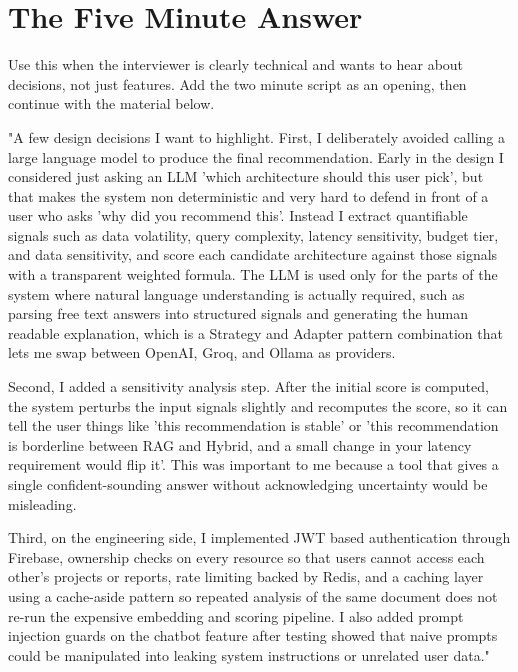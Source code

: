 \documentclass[11pt,a4paper]{report}
\begin{document}
\section{The Five Minute Answer}

Use this when the interviewer is clearly technical and wants to hear about decisions, not just features. Add the two minute script as an opening, then continue with the material below.

\begin{notebox}
"A few design decisions I want to highlight. First, I deliberately avoided calling a large language model to produce the final recommendation. Early in the design I considered just asking an LLM 'which architecture should this user pick', but that makes the system non deterministic and very hard to defend in front of a user who asks 'why did you recommend this'. Instead I extract quantifiable signals such as data volatility, query complexity, latency sensitivity, budget tier, and data sensitivity, and score each candidate architecture against those signals with a transparent weighted formula. The LLM is used only for the parts of the system where natural language understanding is actually required, such as parsing free text answers into structured signals and generating the human readable explanation, which is a Strategy and Adapter pattern combination that lets me swap between OpenAI, Groq, and Ollama as providers.

Second, I added a sensitivity analysis step. After the initial score is computed, the system perturbs the input signals slightly and recomputes the score, so it can tell the user things like 'this recommendation is stable' or 'this recommendation is borderline between RAG and Hybrid, and a small change in your latency requirement would flip it'. This was important to me because a tool that gives a single confident-sounding answer without acknowledging uncertainty would be misleading.

Third, on the engineering side, I implemented JWT based authentication through Firebase, ownership checks on every resource so that users cannot access each other's projects or reports, rate limiting backed by Redis, and a caching layer using a cache-aside pattern so repeated analysis of the same document does not re-run the expensive embedding and scoring pipeline. I also added prompt injection guards on the chatbot feature after testing showed that naive prompts could be manipulated into leaking system instructions or unrelated user data."
\end{notebox}
\end{document}
